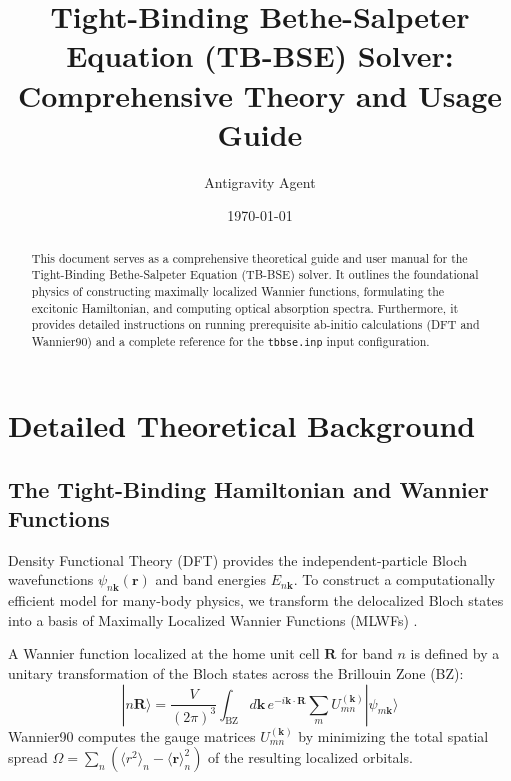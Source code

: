 \documentclass[11pt, a4paper]{article}
\title{\textbf{Tight-Binding Bethe-Salpeter Equation (TB-BSE) Solver: Comprehensive Theory and Usage Guide}}
\author{Antigravity Agent}
\date{\today}
\begin{document}
\maketitle

\begin{abstract}
This document serves as a comprehensive theoretical guide and user manual for the Tight-Binding Bethe-Salpeter Equation (TB-BSE) solver. It outlines the foundational physics of constructing maximally localized Wannier functions, formulating the excitonic Hamiltonian, and computing optical absorption spectra. Furthermore, it provides detailed instructions on running prerequisite ab-initio calculations (DFT and Wannier90) and a complete reference for the \texttt{tbbse.inp} input configuration.
\end{abstract}

\tableofcontents
\newpage

\section{Detailed Theoretical Background}

\subsection{The Tight-Binding Hamiltonian and Wannier Functions}
Density Functional Theory (DFT) provides the independent-particle Bloch wavefunctions $\psi_{n\mathbf{k}}(\mathbf{r})$ and band energies $E_{n\mathbf{k}}$. To construct a computationally efficient model for many-body physics, we transform the delocalized Bloch states into a basis of Maximally Localized Wannier Functions (MLWFs) \cite{marzari1997, marzari2012}. 

A Wannier function localized at the home unit cell $\mathbf{R}$ for band $n$ is defined by a unitary transformation of the Bloch states across the Brillouin Zone (BZ):
\begin{equation}
    |n \mathbf{R} \rangle = \frac{V}{(2\pi)^3} \int_{\text{BZ}} d\mathbf{k} \, e^{-i \mathbf{k} \cdot \mathbf{R}} \sum_{m} U_{mn}^{(\mathbf{k})} |\psi_{m\mathbf{k}}\rangle
\end{equation}
Wannier90 computes the gauge matrices $U_{mn}^{(\mathbf{k})}$ by minimizing the total spatial spread $\Omega = \sum_n (\langle r^2 \rangle_n - \langle \mathbf{r} \rangle_n^2)$ of the resulting localized orbitals.
\end{document}
